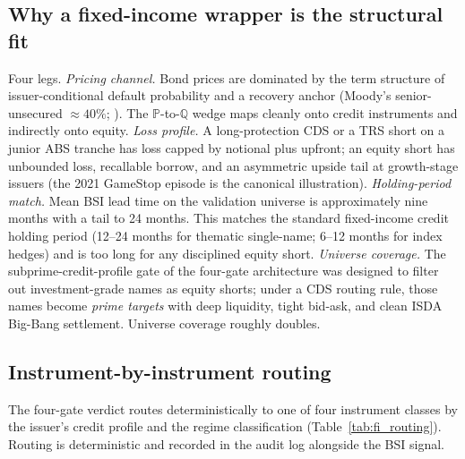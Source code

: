 \documentclass[11pt,a4paper]{article}
\begin{document}
\subsection*{Why a fixed-income wrapper is the structural fit}

Four legs. \textit{Pricing channel.} Bond prices are dominated by the term structure of issuer-conditional default probability and a recovery anchor (Moody's senior-unsecured $\approx 40\%$; \citealp{moodys2024recovery}). The $\mathbb{P}$-to-$\mathbb{Q}$ wedge maps cleanly onto credit instruments and indirectly onto equity. \textit{Loss profile.} A long-protection CDS or a TRS short on a junior ABS tranche has loss capped by notional plus upfront; an equity short has unbounded loss, recallable borrow, and an asymmetric upside tail at growth-stage issuers (the 2021 GameStop episode is the canonical illustration). \textit{Holding-period match.} Mean BSI lead time on the validation universe is approximately nine months with a tail to 24 months. This matches the standard fixed-income credit holding period (12--24 months for thematic single-name; 6--12 months for index hedges) and is too long for any disciplined equity short. \textit{Universe coverage.} The subprime-credit-profile gate of the four-gate architecture was designed to filter out investment-grade names as equity shorts; under a CDS routing rule, those names become \emph{prime targets} with deep liquidity, tight bid-ask, and clean ISDA Big-Bang settlement. Universe coverage roughly doubles.

\subsection*{Instrument-by-instrument routing}

The four-gate verdict routes deterministically to one of four instrument classes by the issuer's credit profile and the regime classification (Table~\ref{tab:fi_routing}). Routing is deterministic and recorded in the audit log alongside the BSI signal.
\end{document}
